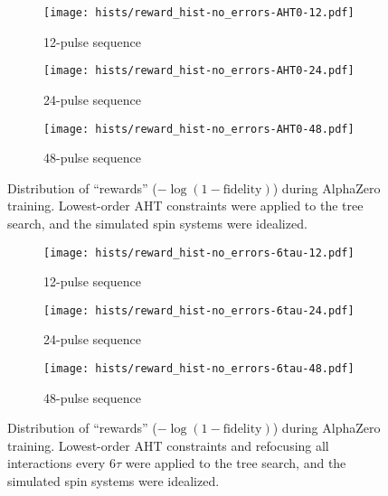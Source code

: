 
\begin{figure}[H]
    \centering
    \begin{subfigure}{.49\textwidth}
        \centering
        \texttt{[image: hists/reward\_hist-no\_errors-AHT0-12.pdf]}
        \caption{12-pulse sequence}
        \label{fig:reward_hist-no_errors-AHT0-12}
    \end{subfigure}
    \begin{subfigure}{.49\textwidth}
        \centering
        \texttt{[image: hists/reward\_hist-no\_errors-AHT0-24.pdf]}
        \caption{24-pulse sequence}
        \label{fig:reward_hist-no_errors-AHT0-24}
    \end{subfigure}
    \begin{subfigure}{.49\textwidth}
        \centering
        \texttt{[image: hists/reward\_hist-no\_errors-AHT0-48.pdf]}
        \caption{48-pulse sequence}
        \label{fig:reward_hist-no_errors-AHT0-48}
    \end{subfigure}
    \caption{Distribution of ``rewards'' ($-\log(1 - \text{fidelity})$) during AlphaZero training. Lowest-order AHT constraints were applied to the tree search, and the simulated spin systems were idealized.}
    \label{fig:reward_hist-no_errors-AHT0}
\end{figure}



\begin{figure}[H]
    \centering
    \begin{subfigure}{.49\textwidth}
        \centering
        \texttt{[image: hists/reward\_hist-no\_errors-6tau-12.pdf]}
        \caption{12-pulse sequence}
        \label{fig:reward_hist-no_errors-6tau-12}
    \end{subfigure}
    \begin{subfigure}{.49\textwidth}
        \centering
        \texttt{[image: hists/reward\_hist-no\_errors-6tau-24.pdf]}
        \caption{24-pulse sequence}
        \label{fig:reward_hist-no_errors-6tau-24}
    \end{subfigure}
    \begin{subfigure}{.49\textwidth}
        \centering
        \texttt{[image: hists/reward\_hist-no\_errors-6tau-48.pdf]}
        \caption{48-pulse sequence}
        \label{fig:reward_hist-no_errors-6tau-48}
    \end{subfigure}
    \caption{Distribution of ``rewards'' ($-\log(1 - \text{fidelity})$) during AlphaZero training. Lowest-order AHT constraints and refocusing all interactions every $6\tau$ were applied to the tree search, and the simulated spin systems were idealized.}
    \label{fig:reward_hist-no_errors-6tau}
\end{figure}



